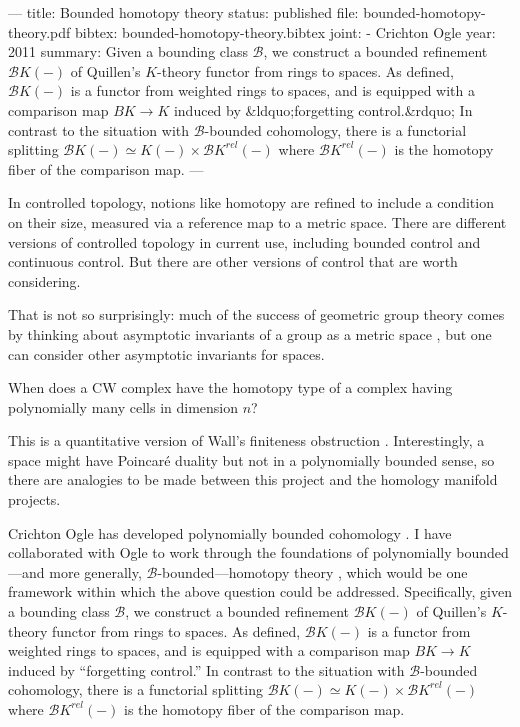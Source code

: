 ---
title: Bounded homotopy theory
status: published
file: bounded-homotopy-theory.pdf
bibtex: bounded-homotopy-theory.bibtex
joint:
  - Crichton Ogle
year: 2011
summary: Given a bounding class ${\mathcal B}$, we construct a bounded refinement ${\mathcal{B}K}(-)$ of Quillen's $K$-theory functor from rings to spaces. As defined, ${\mathcal{B}K}(-)$ is a functor from weighted rings to spaces, and is equipped with a comparison map $BK \to K$ induced by &ldquo;forgetting control.&rdquo; In contrast to the situation with $\mathcal{B}$-bounded cohomology, there is a functorial splitting ${\mathcal{B}K}(-) \simeq K(-) \times {\mathcal{B}K}^{rel}(-)$ where ${\mathcal{B}K}^{rel}(-)$ is the homotopy fiber of the comparison map.
---

In controlled topology, notions like homotopy are refined to include a condition on their size, measured via a reference map to a metric space.  There are different versions of controlled topology in current use, including bounded control and continuous control. But there are other versions of control that are worth considering.

That is not so surprisingly: much of the success of geometric group theory comes by thinking about asymptotic invariants of a group as a metric space \cite{MR1253544}, but one can consider other asymptotic invariants for spaces.
\begin{question}
When does a CW complex have the homotopy type of a complex having polynomially many cells in dimension $n$?
\end{question}
This is a quantitative version of Wall's finiteness obstruction \cite{MR171284}.  Interestingly, a space might have Poincar\'e duality but not in a polynomially bounded sense, so there are analogies to be made between this project and the homology manifold projects.

Crichton Ogle has developed polynomially bounded cohomology \cite{MR2109110}.  I have collaborated with Ogle to work through the foundations of polynomially bounded---and more generally, $\mathcal{B}$-bounded---homotopy theory \cite{MR2962981}, which would be one framework within which the above question could be addressed. Specifically, given a bounding class $\mathcal{B}$, we construct a bounded refinement ${\mathcal{B} K}(-)$ of Quillen's $K$-theory functor from rings to spaces. As defined, ${\mathcal{B} K}(-)$ is a functor from weighted rings to spaces, and is equipped with a comparison map $BK \to K$ induced by ``forgetting control.''  In contrast to the situation with $\mathcal{B}$-bounded cohomology, there is a functorial splitting ${\mathcal{B} K}(-) \simeq K(-) \times {\mathcal{B} K}^{rel}(-)$ where ${\mathcal{B} K}^{rel}(-)$ is the homotopy fiber of the comparison map.


